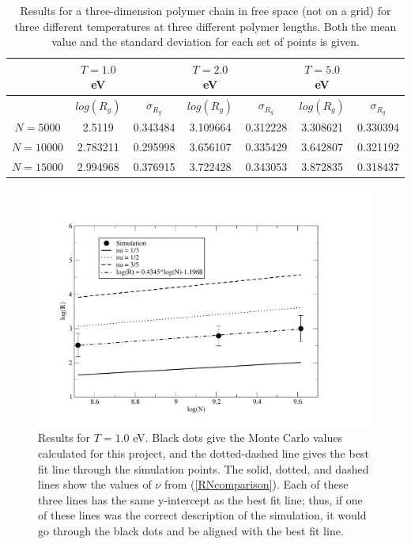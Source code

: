 \documentclass{article}
\begin{document}
\begin{multicols}{2}
\begin{table}
\begin{center}
\begin{tabular}{| c | c | c | c | c | c | c |}
\hline & $T=1.0$ eV &  & $T=2.0$ eV &  & $T=5.0$ eV & \\ \hline
 & \textbf{$log(R_g)$} & \textbf{$\sigma _{R_g}$} & \textbf{$log(R_g)$} & \textbf{$\sigma _{R_g}$} & \textbf{$log(R_g)$} & \textbf{$\sigma _{R_g}$} \\ \hline
$N=5000$ & 2.5119 & 0.343484 & 3.109664 & 0.312228 & 3.308621 & 0.330394 \\ \hline
$N=10000$ & 2.783211 & 0.295998 & 3.656107 & 0.335429 & 3.642807 & 0.321192 \\ \hline
$N=15000$ & 2.994968 & 0.376915 & 3.722428 & 0.343053 & 3.872835 & 0.318437 \\ \hline
\end{tabular}
\label{results}
\caption{Results for a three-dimension polymer chain in free space (not on a grid) for three different temperatures at three different polymer lengths.  Both the mean value and the standard deviation for each set of points is given.}
\end{center}
\end{table}

\begin{figure}[H]
\begin{center}
\includegraphics[width=\linewidth]{Figures/T1plot.pdf}
\caption{Results for $T=1.0$ eV.  Black dots give the Monte Carlo values calculated for this project, and the dotted-dashed line gives the best fit line through the simulation points.  The solid, dotted, and dashed lines show the values of $\nu$ from (\ref{RNcomparison}).  Each of these three lines has the same y-intercept as the best fit line; thus, if one of these lines was the correct description of the simulation, it would go through the black dots and be aligned with the best fit line.}
\label{T1fig}
\end{center}
\end{figure}


\end{multicols}
\end{document}
